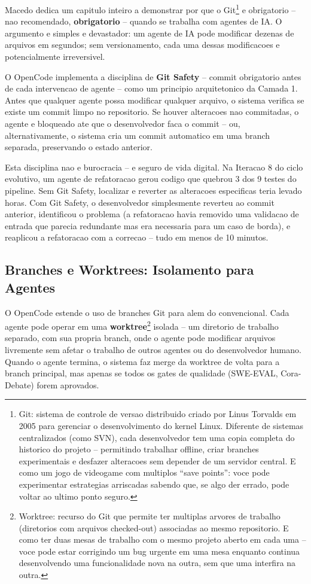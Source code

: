 \documentclass[12pt,a4paper,oneside,sumario=tradicional,chapter=TITLE,section=TITLE,subsection=TITLE,english,brazil]{abntex2}
\begin{document}
Macedo \cite[Cap. 3]{macedo2026engenharia} dedica um capitulo inteiro a demonstrar por que o Git\footnote{Git: sistema de controle de versao distribuido criado por Linus Torvalds em 2005 para gerenciar o desenvolvimento do kernel Linux. Diferente de sistemas centralizados (como SVN), cada desenvolvedor tem uma copia completa do historico do projeto -- permitindo trabalhar offline, criar branches experimentais e desfazer alteracoes sem depender de um servidor central. E como um jogo de videogame com multiplos ``save points'': voce pode experimentar estrategias arriscadas sabendo que, se algo der errado, pode voltar ao ultimo ponto seguro.} e obrigatorio -- nao recomendado, \textbf{obrigatorio} -- quando se trabalha com agentes de IA. O argumento e simples e devastador: um agente de IA pode modificar dezenas de arquivos em segundos; sem versionamento, cada uma dessas modificacoes e potencialmente irreversivel.

O OpenCode implementa a disciplina de \textbf{Git Safety} -- commit obrigatorio antes de cada intervencao de agente -- como um principio arquitetonico da Camada 1. Antes que qualquer agente possa modificar qualquer arquivo, o sistema verifica se existe um commit limpo no repositorio. Se houver alteracoes nao commitadas, o agente e bloqueado ate que o desenvolvedor faca o commit -- ou, alternativamente, o sistema cria um commit automatico em uma branch separada, preservando o estado anterior.

Esta disciplina nao e burocracia -- e seguro de vida digital. Na Iteracao 8 do ciclo evolutivo, um agente de refatoracao gerou codigo que quebrou 3 dos 9 testes do pipeline. Sem Git Safety, localizar e reverter as alteracoes especificas teria levado horas. Com Git Safety, o desenvolvedor simplesmente reverteu ao commit anterior, identificou o problema (a refatoracao havia removido uma validacao de entrada que parecia redundante mas era necessaria para um caso de borda), e reaplicou a refatoracao com a correcao -- tudo em menos de 10 minutos.

\subsection{Branches e Worktrees: Isolamento para Agentes}

O OpenCode estende o uso de branches Git para alem do convencional. Cada agente pode operar em uma \textbf{worktree}\footnote{Worktree: recurso do Git que permite ter multiplas arvores de trabalho (diretorios com arquivos checked-out) associadas ao mesmo repositorio. E como ter duas mesas de trabalho com o mesmo projeto aberto em cada uma -- voce pode estar corrigindo um bug urgente em uma mesa enquanto continua desenvolvendo uma funcionalidade nova na outra, sem que uma interfira na outra.} isolada -- um diretorio de trabalho separado, com sua propria branch, onde o agente pode modificar arquivos livremente sem afetar o trabalho de outros agentes ou do desenvolvedor humano. Quando o agente termina, o sistema faz merge da worktree de volta para a branch principal, mas apenas se todos os gates de qualidade (SWE-EVAL, Cora-Debate) forem aprovados.
\end{document}
